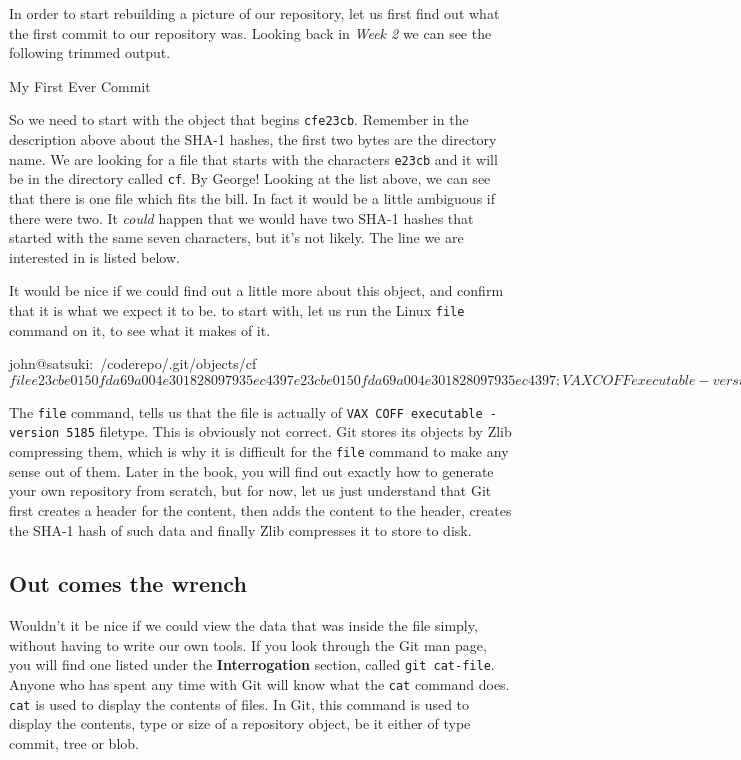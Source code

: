 In order to start rebuilding a picture of our repository, let us first find out what the first commit to our repository was.
Looking back in \emph{Week 2} we can see the following trimmed output.

\begin{code}
 My First Ever Commit
\end{code}

So we need to start with the object that begins \texttt{cfe23cb}.
Remember in the description above about the SHA-1 hashes, the first two bytes are the directory name.
We are looking for a file that starts with the characters \texttt{e23cb} and it will be in the directory called \texttt{cf}.
By George! Looking at the list above, we can see that there is one file which fits the bill.
In fact it would be a little ambiguous if there were two.
It \emph{could} happen that we would have two SHA-1 hashes that started with the same seven characters, but it's not likely.
The line we are interested in is listed below.

\begin{code}
./cf/e23cbe0150fda69a004e301828097935ec4397}
\end{code}

It would be nice if we could find out a little more about this object, and confirm that it is what we expect it to be.
to start with, let us run the Linux \texttt{file} command on it, to see what it makes of it.

\begin{code}
john@satsuki:~/coderepo/.git/objects/cf$ file e23cbe0150fda69a004e301828097935ec4397
e23cbe0150fda69a004e301828097935ec4397: VAX COFF executable - version 5185
john@satsuki:~/coderepo/.git/objects/cf$
\end{code}

The \texttt{file} command, tells us that the file is actually of \texttt{VAX COFF executable - version 5185} filetype.
This is obviously not correct.
Git stores its objects by Zlib compressing them, which is why it is difficult for the \texttt{file} command to make any sense out of them.
Later in the book, you will find out exactly how to generate your own repository from scratch, but for now, let us just understand that Git first creates a header for the content, then adds the content to the header, creates the SHA-1 hash of such data and finally Zlib compresses it to store to disk.

\subsection{Out comes the wrench}
Wouldn't it be nice if we could view the data that was inside the file simply, without having to write our own tools.
If you look through the Git man page, you will find one listed under the \textbf{Interrogation} section, called \texttt{git cat-file}.
Anyone who has spent any time with Git will know what the \texttt{cat} command does.
\texttt{cat} is used to display the contents of files.
In Git, this command is used to display the contents, type or size of a repository object, be it either of type commit, tree or blob.

